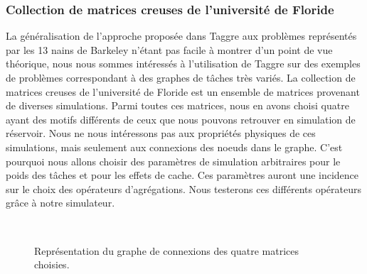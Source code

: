 \subsubsection{Collection de matrices creuses de l'université de Floride}
La généralisation de l'approche proposée dans Taggre aux problèmes représentés par les 13 nains de Barkeley n'étant pas facile à montrer d'un point de vue théorique, nous nous sommes intéressés à l'utilisation de Taggre sur des exemples de problèmes correspondant à des graphes de tâches très variés.
%
La collection de matrices creuses de l'université de Floride est un ensemble de matrices provenant de diverses simulations.
%
Parmi toutes ces matrices, nous en avons choisi quatre ayant des motifs différents de ceux que nous pouvons retrouver en simulation de réservoir.
%
Nous ne nous intéressons pas aux propriétés physiques de ces simulations, mais seulement aux connexions des noeuds dans le graphe.
%
C'est pourquoi nous allons choisir des paramètres de simulation arbitraires pour le poids des tâches et pour les effets de cache.
%
Ces paramètres auront une incidence sur le choix des opérateurs d'agrégations.
%
Nous testerons ces différents opérateurs grâce à notre simulateur.


\begin{figure}[!h]
     \begin{center}
        ~
        ~
    \end{center}
    \caption{Représentation du graphe de connexions des quatre matrices choisies.}
    \label{fig:florida}
\end{figure}


